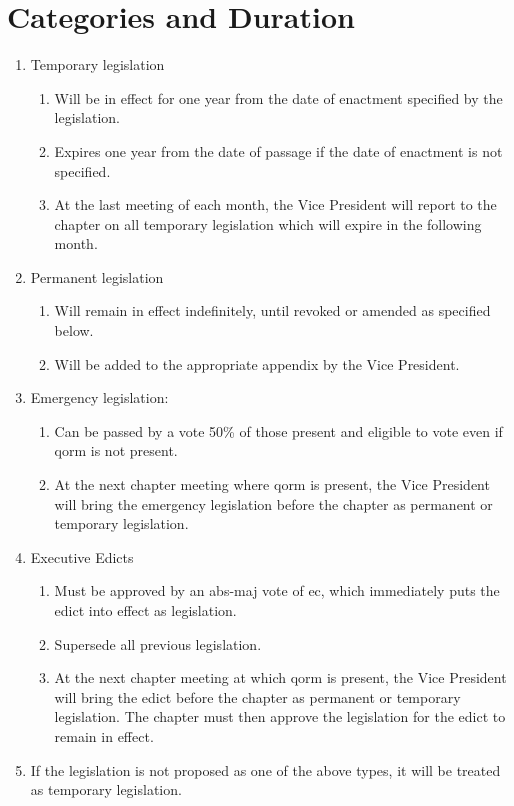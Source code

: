 	\section{Categories and Duration}
		\begin{enumerate}
			\item Temporary legislation 
			\begin{enumerate}
				\item Will be in effect for one year from the date of enactment specified by the legislation.
				\item Expires one year from the date of passage if the date of enactment is not specified.
				\item At the last meeting of each month, the Vice President will report to the chapter on all temporary legislation which will expire in the following month.
			\end{enumerate}
			\item Permanent legislation
			\begin{enumerate}
				\item Will remain in effect indefinitely, until revoked or amended as specified below.
				\item Will be added to the appropriate appendix by the Vice President.
			\end{enumerate}
			\item Emergency legislation:
			\begin{enumerate}
				\item Can be passed by a vote 50\% of those present and eligible to vote even if \gls{qorm} is not present. %
				\item At the next chapter meeting where \gls{qorm} is present, the Vice President will bring the emergency legislation before the chapter as permanent or temporary legislation.
			\end{enumerate}
			\item Executive Edicts
			\label{exec-edict}
			\begin{enumerate}
				\item Must be approved by an \gls{abs-maj} vote of \gls{ec}, which immediately puts the edict into effect as legislation.
				\item Supersede all previous legislation.
				\item At the next chapter meeting at which \gls{qorm} is present, the Vice President will bring the edict before the chapter as permanent or temporary legislation. The chapter must then approve the legislation for the edict to remain in effect. %
			\end{enumerate}
			\item If the legislation is not proposed as one of the above types, it will be treated as temporary legislation.
		\end{enumerate}


